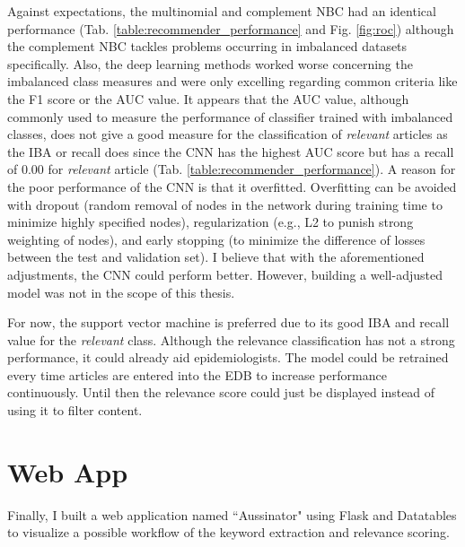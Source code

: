   Against expectations, the multinomial and complement NBC had an identical performance (Tab. \ref{table:recommender_performance} and Fig. \ref{fig:roc}) although the complement NBC tackles problems occurring in imbalanced datasets specifically.
  Also, the deep learning methods worked worse concerning the imbalanced class measures and were only excelling regarding common criteria like the F1 score or the AUC value.
  It appears that the AUC value, although commonly used to measure the performance of classifier trained with imbalanced classes, does not give a good measure for the classification of \textsl{relevant} articles as the IBA or recall does since the CNN has the highest AUC score but has a recall of 0.00 for \textsl{relevant} article (Tab. \ref{table:recommender_performance}).
  A reason for the poor performance of the CNN is that it overfitted.
  Overfitting can be avoided with dropout (random removal of nodes in the network during training time to minimize highly specified nodes), regularization (e.g., L2 to punish strong weighting of nodes), and early stopping (to minimize the difference of losses between the test and validation set).
  I believe that with the aforementioned adjustments, the CNN could perform better.
  However, building a well-adjusted model was not in the scope of this thesis.

  For now, the support vector machine is preferred due to its good IBA and recall value for the \textsl{relevant} class.
  Although the relevance classification has not a strong performance, it could already aid epidemiologists.
  The model could be retrained every time articles are entered into the EDB to increase performance continuously. Until then the relevance score could just be displayed instead of using it to filter content.

\section{Web App}
  Finally, I built a web application named ``Aussinator" using Flask and Datatables to visualize a possible workflow of the keyword extraction and relevance scoring.

